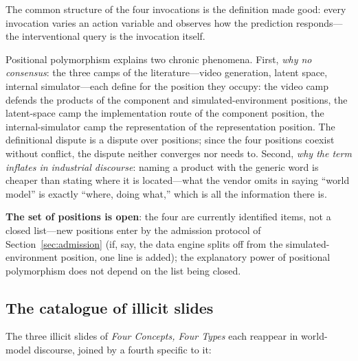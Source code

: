 \documentclass[10pt]{article}
\begin{document}
The common structure of the four invocations is the definition made good: every invocation varies an action variable and observes how the prediction responds---the interventional query is the invocation itself.

Positional polymorphism explains two chronic phenomena. First, \emph{why no consensus}: the three camps of the literature---video generation\cite{openai2024sora}, latent space\cite{lecun2022path}, internal simulator\cite{chen2026definition}---each define for the position they occupy: the video camp defends the products of the component and simulated-environment positions, the latent-space camp the implementation route of the component position, the internal-simulator camp the representation of the representation position. The definitional dispute is a dispute over positions; since the four positions coexist without conflict, the dispute neither converges nor needs to. Second, \emph{why the term inflates in industrial discourse}: naming a product with the generic word is cheaper than stating where it is located---what the vendor omits in saying ``world model'' is exactly ``where, doing what,'' which is all the information there is.

\textbf{The set of positions is open}: the four are currently identified items, not a closed list---new positions enter by the admission protocol of Section~\ref{sec:admission} (if, say, the data engine splits off from the simulated-environment position, one line is added); the explanatory power of positional polymorphism does not depend on the list being closed.

\subsection{The catalogue of illicit slides}\label{sec:slips}

The three illicit slides of \emph{Four Concepts, Four Types}\cite{yu2026fourconcepts} each reappear in world-model discourse, joined by a fourth specific to it:
\end{document}
